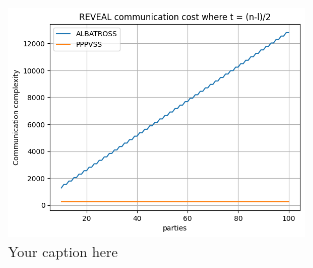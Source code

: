 \begin{figure}[htbp]
  \centering
  \includegraphics[width=0.7\textwidth]{figures/reveal_comm.png}
  \caption{Your caption here}
  \label{fig:your-label}
\end{figure}